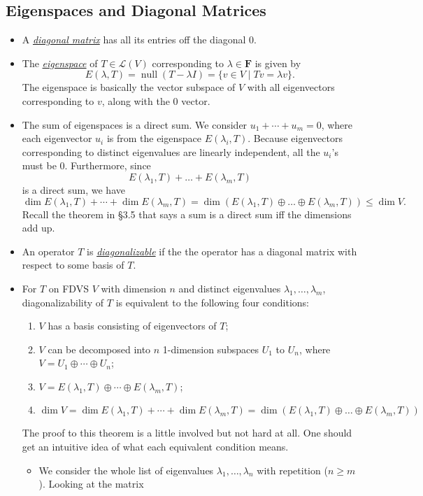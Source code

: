 \documentclass{article}
\newcommand{\df}[1]{\ul{\textit{#1}}}
\newcommand{\F}{\mathbf{F}}
\newcommand{\n}{\operatorname{null}}
\renewcommand{\d}{\dim}
\newcommand{\LV}{\mathcal{L}(V)}
\begin{document}
\subsection{Eigenspaces and Diagonal Matrices}
\begin{itemize}
    \item A \df{diagonal matrix} has all its entries off the diagonal 0.
    \item The \df{eigenspace} of $T \in \LV$ corresponding to $\lambda \in \F$ is given by $$E(\lambda,T) = \n (T-\lambda I) = \{v \in V \mid Tv = \lambda v\}.$$
    The eigenspace is basically the vector subspace of $V$ with all eigenvectors corresponding to $v$, along with the 0 vector.
    \item The sum of eigenspaces is a direct sum. We consider $u_1+\cdots+u_m = 0$, where each eigenvector $u_i$ is from the eigenspace $E(\lambda_i,T)$. Because eigenvectors corresponding to distinct eigenvalues are linearly independent, all the $u_i$'s must be 0. Furthermore, since $$E(\lambda_1,T)+\dots+E(\lambda_m,T)$$ is a direct sum, we have $$\d E(\lambda_1,T) + \cdots + \d E(\lambda_m,T) = \d (E(\lambda_1,T) \oplus \dots \oplus E(\lambda_m,T)) \leq \d V.$$ Recall the theorem in \S3.5 that says a sum is a direct sum iff the dimensions add up.
    \item An operator $T$ is \df{diagonalizable} if the the operator has a diagonal matrix with respect to some basis of $T$.
    \item For $T$ on FDVS $V$ with dimension $n$ and distinct eigenvalues $\lambda_1, \dots, \lambda_m$, diagonalizability of $T$ is equivalent to the following four conditions:
    \begin{enumerate}[label=(\alph*)]
        \item $V$ has a basis consisting of eigenvectors of $T$;
        \item $V$ can be decomposed into $n$ 1-dimension subspaces $U_1$ to $U_n$, where $V = U_1 \oplus \cdots \oplus U_n$;
        \item $V = E(\lambda_1,T) \oplus \cdots \oplus E(\lambda_m,T)$;
        \item $\d V = \d E(\lambda_1,T) + \cdots + \d E(\lambda_m,T) = \d (E(\lambda_1,T) \oplus \dots \oplus E(\lambda_m,T))$
    \end{enumerate}
    The proof to this theorem is a little involved but not hard at all. One should get an intuitive idea of what each equivalent condition means.
    \begin{itemize}
    \item We consider the whole list of eigenvalues $\lambda_1, \dots, \lambda_n$ with repetition ($n \geq m$). Looking at the matrix

\end{itemize}
\end{itemize}
\end{document}
